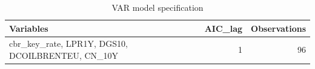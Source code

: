 \begin{table}
\caption{VAR model specification}
\label{tab:5_5}
\begin{tabular}{lrr}
\toprule
Variables & AIC_lag & Observations \\
\midrule
cbr_key_rate, LPR1Y, DGS10, DCOILBRENTEU, CN_10Y & 1 & 96 \\
\bottomrule
\end{tabular}
\end{table}
